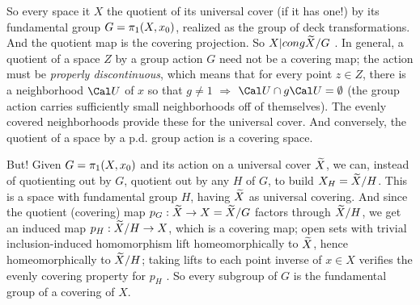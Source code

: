 \msk

So every space it $X$ the quotient of its universal cover (if it has
one!) by its fundamental group $G=\pi_1(X,x_0)$, realized as the group
of deck transformations. And the quotient map is the covering 
projection. So $X|cong \widetilde{X}/G$ . In general, a quotient of a 
space $Z$ by a group action $G$ 
need not be 
a covering map; the action must be {\it properly discontinuous}, 
which means that for every point 
 $z\in Z$, there is a neighborhood ${\Cal U}$ of $x$ so that $g\neq 1$ $\Rightarrow$
${\Cal U}\cap g{\Cal U}=\emptyset$ (the group action carries sufficiently
small neighborhoods off of themselves). The evenly covered neighborhoods
provide these for the universal cover. And conversely, the quotient of a space by a 
p.d. group action is a covering space. 

\msk

But! Given $G=\pi_1(X,x_0)$ and its 
action on a universal cover $\widetilde{X}$, we can, instead of quotienting out by $G$,
quotient out by any  $H$ of $G$, to build $X_H=\widetilde{X}/H$. 
This is a space with fundamental group $H$, having $\widetilde{X}$ as universal covering.
And since the quotient (covering) map $p_G:\widetilde{X}\rightarrow X=\widetilde{X}/G$ factors through $\widetilde{X}/H$,
we get an induced map $p_H:\widetilde{X}/H\rightarrow X$, which is a covering map; open sets with
trivial inclusion-induced homomorphism lift homeomorphically to $\widetilde{X}$,
hence homeomorphically to $\widetilde{X}/H$; taking lifts to each point inverse of $x\in X$
verifies the evenly covering property for $p_H$ . So every subgroup of $G$ is the
fundamental group of a covering of $X$. 

\ssk

